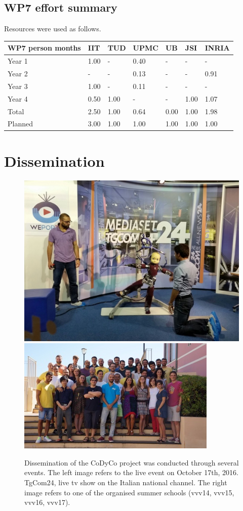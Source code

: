 \documentclass[12pt,a4paper,twoside]{article}
\begin{document}
\subsection{WP7 effort summary}
Resources were used as follows.

\begin{center}
\begin{tabular}{|C{1.5cm}|C{1.5cm}|C{1.5cm}|C{2cm}|C{2cm}|C{2cm}|C{2cm}|}
\hline
\footnotesize \textbf{WP7 person months}& \footnotesize \textbf{IIT}&\footnotesize \textbf{TUD}&\footnotesize \textbf{UPMC}& \footnotesize \textbf{UB} &\footnotesize \textbf{JSI} & \footnotesize \textbf{INRIA} \\ \hline
\footnotesize Year 1 &  1.00 & -    & 0.40 & -    & -    & - \\  \hline
\footnotesize Year 2 &  -    & -    & 0.13 & -    & -    & 0.91 \\  \hline
\footnotesize Year 3 &  1.00 & - & 0.11 & - & - & - \\ \hline
\footnotesize Year 4  & 0.50  &  1.00 &  -    &  -     &  1.00  &  1.07    \\  \hline
\footnotesize Total & 2.50 &  1.00 &  0.64 &  0.00 &  1.00 &  1.98    \\
\hline \hline
\footnotesize Planned & 3.00 & 1.00 & 1.00 & 1.00 & 1.00 & 1.00 \\ \hline
\end{tabular}
\end{center}

\section{Dissemination}

\begin{figure}
  \centering
    \includegraphics[height=.25\textwidth]{images/tg24}
    \hspace{1cm}
    \includegraphics[height=.25\textwidth]{images/vvv}
  \caption{Dissemination of the CoDyCo project was conducted through several events. The left image refers to the
  live event on October 17th, 2016. TgCom24, live tv show on the Italian national channel. The right image refers to one of the organised summer schools (vvv14, vvv15, vvv16, vvv17). }
\end{figure}
\end{document}
